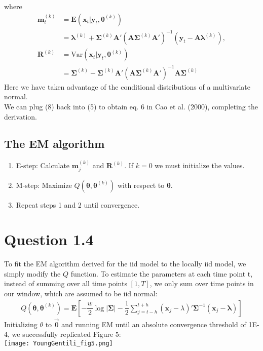 \documentclass[10pt]{article}
\begin{document}
where
\begin{align}
\mathbf{m}_t^{(k)} &= \mathbf{E}(\mathbf{x}_t|\mathbf{y}_t,\mathbf{\theta}^{(k)})\\
&= \mathbf{\lambda}^{(k)} + \mathbf{\Sigma}^{(k)}\mathbf{A}'(\mathbf{A}\mathbf{\Sigma}^{(k)}\mathbf{A}')^{-1}(\mathbf{y}_t - \mathbf{A}\mathbf{\lambda}^{(k)}),\\
\mathbf{R}^{(k)} &= \mathrm{Var}(\mathbf{x}_t|\mathbf{y}_t,\mathbf{\theta}^{(k)})\\
&= \mathbf{\Sigma}^{(k)} - \mathbf{\Sigma}^{(k)}\mathbf{A}'(\mathbf{A}\mathbf{\Sigma}^{(k)}\mathbf{A}')^{-1}\mathbf{A}\mathbf{\Sigma}^{(k)}
\end{align}
Here we have taken advantage of the conditional distributions of a multivariate normal.\\
We can plug (8) back into (5) to obtain eq. 6 in Cao et al. (2000), completing the derivation.
\subsection*{The EM algorithm}
\begin{enumerate}
\item E-step: Calculate $\mathbf{m}_j^{(k)}$ and $\mathbf{R}^{(k)}$. If $k=0$ we must initialize the values.
\item M-step: Maximize $Q(\mathbf{\theta}, \mathbf{\theta}^{(k)})$ with respect to $\mathbf{\theta}$.
\item Repeat steps 1 and 2 until convergence.
\end{enumerate}
\section*{Question 1.4}
To fit the EM algorithm derived for the iid model to the locally iid model, we simply modify the $Q$ function. To estimate the parameters at each time point t, instead of summing over all time points $[1, T]$, we only sum over time points in our window, which are assumed to be iid normal:
\begin{align}
Q(\mathbf{\theta}, \mathbf{\theta}^{(k)})=\mathbf{E}\left[-\dfrac{w}{2}\log{|\mathbf{\Sigma}|} - \dfrac{1}{2}\sum_{j=t-h}^{t+h} (\mathbf{x}_j - \lambda)'\mathbf{\Sigma}^{-1}(\mathbf{x}_j-\mathbf{\lambda})\right]
\end{align}
Initializing $\theta$ to $\vec{0}$ and running EM until an absolute convergence threshold of 1E-4, we successfully replicated Figure 5:\\
\texttt{[image: YoungGentili\_fig5.png]}\\
\end{document}
